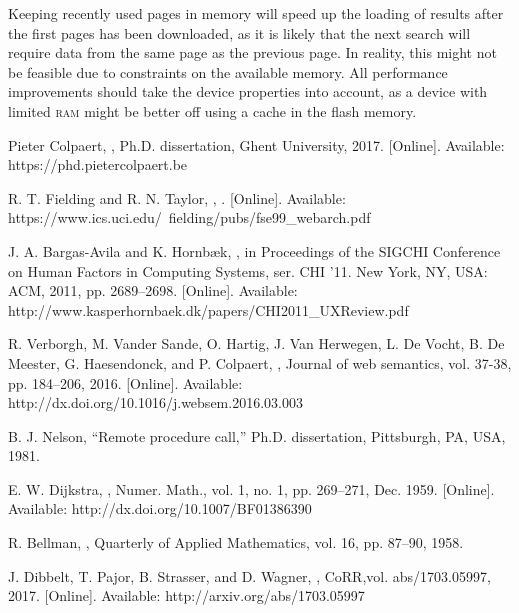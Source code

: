\documentclass[twocolumn]{phdsymp} %
\begin{document}
Keeping recently used pages in memory will speed up the loading of results after the first pages has been downloaded, as it is likely that the next search will require data from the same page as the previous page. In reality, this might not be feasible due to constraints on the available memory. All performance improvements should take the device properties into account, as a device with limited \textsc{ram} might be better off using a cache in the flash memory.

\nocite{*}



%
\begin{thebibliography}{1}
Pieter Colpaert,
,
\newblock Ph.D. dissertation, Ghent University, 2017. [Online]. Available: https://phd.pietercolpaert.be

R. T. Fielding and R. N. Taylor, 
,
. [Online]. Available: https://www.ics.uci.edu/~fielding/pubs/fse99\_webarch.pdf

J. A. Bargas-Avila and K. Hornbæk, 
,
in Proceedings of the SIGCHI Conference on Human Factors in Computing Systems, ser. CHI ’11. New York, NY, USA: ACM, 2011, pp. 2689–2698. [Online]. Available: http://www.kasperhornbaek.dk/papers/CHI2011\_UXReview.pdf

R. Verborgh, M. Vander Sande, O. Hartig, J. Van Herwegen, L. De Vocht, B. De Meester, G. Haesendonck, and P. Colpaert, 
,
\newblock Journal of web semantics, vol. 37-38, pp. 184–206, 2016. [Online]. Available: http://dx.doi.org/10.1016/j.websem.2016.03.003

B. J. Nelson, “Remote procedure call,” Ph.D. dissertation, Pittsburgh, PA, USA, 1981.

E. W. Dijkstra, 
,
\newblock Numer. Math., vol. 1, no. 1, pp. 269–271, Dec. 1959. [Online]. Available: http://dx.doi.org/10.1007/BF01386390

R. Bellman,
,
\newblock Quarterly of Applied Mathematics, vol. 16, pp. 87–90, 1958.

J. Dibbelt, T. Pajor, B. Strasser, and D. Wagner,
,
\newblock CoRR,vol. abs/1703.05997, 2017. [Online]. Available: http://arxiv.org/abs/1703.05997

\end{thebibliography}
%
\end{document}
